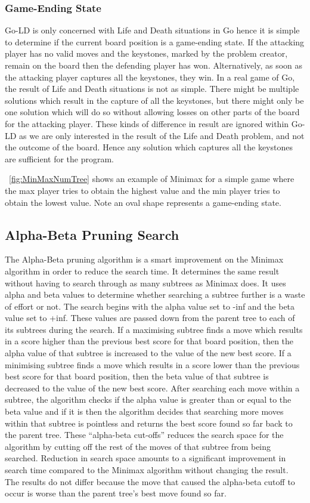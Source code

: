 \documentclass{l4proj}
\begin{document}
\subsubsection{Game-Ending State}
Go-LD is only concerned with Life and Death situations in Go hence it is simple to determine if the current board position is a game-ending state. If the attacking player has no valid moves and the keystones, marked by the problem creator, remain on the board then the defending player has won. Alternatively, as soon as the attacking player captures all the keystones, they win. In a real game of Go, the result of Life and Death situations is not as simple. There might be multiple solutions which result in the capture of all the keystones, but there might only be one solution which will do so without allowing losses on other parts of the board for the attacking player. These kinds of difference in result are ignored within Go-LD as we are only interested in the result of the Life and Death problem, and not the outcome of the board. Hence any solution which captures all the keystones are sufficient for the program.

~\autoref{fig:MinMaxNumTree} shows an example of Minimax for a simple game where the max player tries to obtain the highest value and the min player tries to obtain the lowest value. Note an oval shape represents a game-ending state.

\subsection{Alpha-Beta Pruning Search}
The Alpha-Beta pruning algorithm is a smart improvement on the Minimax algorithm in order to reduce the search time. It determines the same result without having to search through as many subtrees as Minimax does. It uses alpha and beta values to determine whether searching a subtree further is a waste of effort or not. The search begins with the alpha value set to -inf and the beta value set to +inf. These values are passed down from the parent tree to each of its subtrees during the search. If a maximising subtree finds a move which results in a score higher than the previous best score for that board position, then the alpha value of that subtree is increased to the value of the new best score. If a minimising subtree finds a move which results in a score lower than the previous best score for that board position, then the beta value of that subtree is decreased to the value of the new best score. After searching each move within a subtree, the algorithm checks if the alpha value is greater than or equal to the beta value and if it is then the algorithm decides that searching more moves within that subtree is pointless and returns the best score found so far back to the parent tree. These “alpha-beta cut-offs” reduces the search space for the algorithm by cutting off the rest of the moves of that subtree from being searched. Reduction in search space amounts to a significant improvement in search time compared to the Minimax algorithm without changing the result. The results do not differ because the move that caused the alpha-beta cutoff to occur is worse than the parent tree’s best move found so far.
\end{document}

